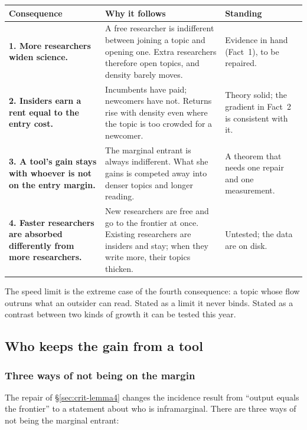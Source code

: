 \begin{center}\small
\begin{tabularx}{\textwidth}{@{}P{1.75in}LP{1.25in}@{}}
\toprule
Consequence & Why it follows & Standing \\
\midrule
\textbf{1. More researchers widen science.} & A free researcher is indifferent between joining a topic and opening one. Extra researchers therefore open topics, and density barely moves. & Evidence in hand (Fact~1), to be repaired. \\
\textbf{2. Insiders earn a rent equal to the entry cost.} & Incumbents have paid; newcomers have not. Returns rise with density even where the topic is too crowded for a newcomer. & Theory solid; the gradient in Fact~2 is consistent with it. \\
\textbf{3. A tool's gain stays with whoever is not on the entry margin.} & The marginal entrant is always indifferent. What she gains is competed away into denser topics and longer reading. & A theorem that needs one repair and one measurement. \\
\textbf{4. Faster researchers are absorbed differently from more researchers.} & New researchers are free and go to the frontier at once. Existing researchers are insiders and stay; when they write more, their topics thicken. & Untested; the data are on disk. \\
\bottomrule
\end{tabularx}
\end{center}

The speed limit is the extreme case of the fourth consequence: a topic whose flow outruns what an outsider can read. Stated as a limit it never binds. Stated as a contrast between two kinds of growth it can be tested this year.

\subsection{Who keeps the gain from a tool}\label{sec:ideas-incidence}

\subsubsection{Three ways of not being on the margin}
The repair of \S\ref{sec:crit-lemma4} changes the incidence result from ``output equals the frontier'' to a statement about who is inframarginal. There are three ways of not being the marginal entrant:

